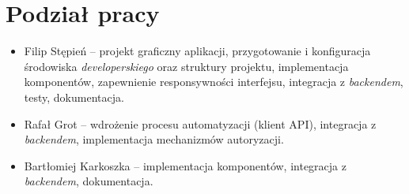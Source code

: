 \documentclass[../../spr.tex]{subfiles}
\begin{document}
\section{Podział pracy}

\begin{itemize}
\item Filip Stępień – projekt graficzny aplikacji, przygotowanie i konfiguracja środowiska \textit{developerskiego} oraz struktury projektu, implementacja komponentów, zapewnienie responsywności interfejsu, integracja z \textit{backendem}, testy, dokumentacja.
\item Rafał Grot – wdrożenie procesu automatyzacji (klient API), integracja z \textit{backendem}, implementacja mechanizmów autoryzacji.
\item Bartłomiej Karkoszka – implementacja komponentów, integracja z \textit{backendem}, dokumentacja.
\end{itemize}
\end{document}
